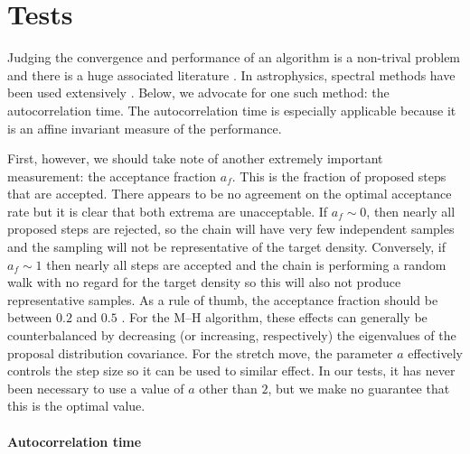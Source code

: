 \documentclass[12pt,preprint]{aastex}
\newcommand{\sectlabel}[1]{\label{sect:#1}}
\newcommand{\af}{\ensuremath{a_f}}
\begin{document}
\section{Tests} \sectlabel{tests}

Judging the convergence and performance of an algorithm is a
non-trival problem and there is a huge associated literature
\citep[see, for example,][for a review]{Cowles:1996}. In astrophysics,
spectral methods have been used extensively \citep[for
example][]{Dunkley:2005}. Below, we advocate for one such method: the
autocorrelation time. The autocorrelation time is especially applicable
because it is an affine invariant measure of the performance.

First,
however, we should take note of another extremely important measurement:
the acceptance fraction \af. This is the fraction of proposed steps that are
accepted. There appears to be no agreement on the optimal acceptance rate
but it is clear that both extrema are unacceptable. If $\af \sim 0$, then
nearly all proposed steps are rejected, so
the chain will have very few independent samples and the sampling will not be
representative of the target density. Conversely, if $\af \sim 1$ then nearly
all steps are accepted and the
chain is performing a random walk with no regard for the target density so
this will also not produce representative samples. As a rule of thumb, the
acceptance fraction should be between $0.2$ and $0.5$
\citep[for example,][]{Gelman:1996}. For the M--H algorithm,
these effects can generally be counterbalanced by decreasing (or increasing,
respectively) the eigenvalues of the proposal distribution covariance. For
the stretch move, the parameter $a$ effectively controls the step size so
it can be used to similar effect. In our tests, it has never been
necessary to use a value of $a$ other than $2$, but we make no guarantee that this
is the optimal value.

\paragraph{Autocorrelation time}
\end{document}
